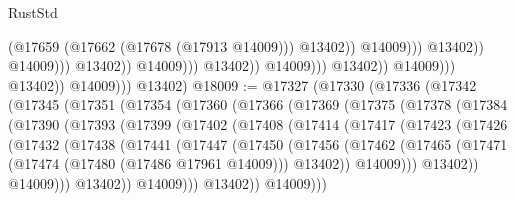 \begin{lexlean}{RustStd}
\begin{coremodule}
                                                                (@17659
                                                                  (@17662 (@17678 (@17913 @14009)))
                                                                  @13402))
                                                              @14009)))
                                                        @13402))
                                                    @14009)))
                                              @13402))
                                          @14009)))
                                    @13402))
                                @14009)))
                          @13402))
                      @14009)))
                @13402))
            @14009)))
      @13402)
@18009 := @17327
    (@17330
      (@17336
        (@17342
          (@17345
            (@17351
              (@17354
                (@17360
                  (@17366
                    (@17369
                      (@17375
                        (@17378
                          (@17384
                            (@17390
                              (@17393
                                (@17399
                                  (@17402
                                    (@17408
                                      (@17414
                                        (@17417
                                          (@17423
                                            (@17426
                                              (@17432
                                                (@17438
                                                  (@17441
                                                    (@17447
                                                      (@17450
                                                        (@17456
                                                          (@17462
                                                            (@17465
                                                              (@17471
                                                                (@17474
                                                                  (@17480 (@17486 @17961 @14009)))
                                                                @13402))
                                                            @14009)))
                                                      @13402))
                                                  @14009)))
                                            @13402))
                                        @14009)))
                                  @13402))
                              @14009)))

\end{coremodule}
\end{lexlean}
